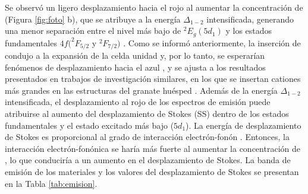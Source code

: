 Se observó un ligero desplazamiento hacia el rojo al aumentar la concentración
de  (Figura \ref{fig:foto} b), que se atribuye a la energía
$\Delta_{1-2}$
intensificada,
generando una menor separación entre el nivel más bajo de $^2E_g(5d_1)$ y los
estados fundamentales $4f(^2F_{5/2}$ y $^2F_{7/2})$ \cite{Chen2015a,Hu2019}.
Como se
informó
anteriormente, la inserción de  condujo a la expansión de la celda
unidad
y, por lo tanto, se esperarían fenómenos de desplazamiento hacia el azul
\cite{Ueda2019,Dorenbos2013}, y se ajusta a los resultados presentados en
trabajos de
investigación
similares, en los que se insertan cationes más grandes en las estructuras del
granate huésped \cite{Chen2015a,Kamada2011,Hu2015}. Además de la energía
$\Delta_{1-2}$
intensificada, el
desplazamiento al rojo de los espectros de emisión puede atribuirse al aumento
del desplazamiento de Stokes (SS) dentro de los estados fundamentales y el
estado excitado más bajo ($5d_1$). La energía de desplazamiento de Stokes es
proporcional al grado de interacción electrón-fonón \cite{Ueda2019}. Entonces,
la
interacción electrón-fonónica se haría más fuerte al aumentar la concentración
de , lo que conduciría a un aumento en el desplazamiento de Stokes.
La
banda de emisión de los materiales y los valores del desplazamiento de Stokes
se presentan en la Tabla \ref{tab:emision}.\\

\begin{table}[]
    \caption{Banda de emisión y desplazamiento de Stokes de :}
    \label{tab:emision}
\end{table}

